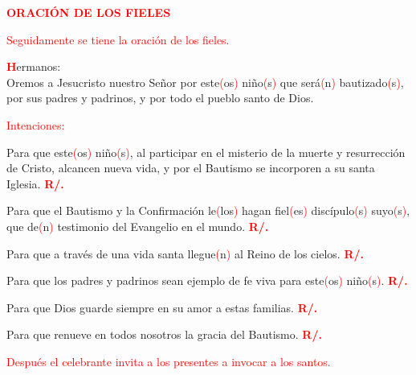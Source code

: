 \documentclass[12pt, letterpaper, spanish]{article}
\begin{document}
  \Large {\bfseries \textcolor{red}{ORACI\'ON DE LOS FIELES}} 

  \large {\textcolor{red}{Seguidamente se tiene la oraci\'on de los fieles.}} 

  \lettrine[lines=2]{\bfseries \textcolor{red}{H}}{}\Large ermanos:\\
  Oremos a Jesucristo nuestro Se\~nor por este\textcolor{red}{(}os\textcolor{red}{)} ni\~no\textcolor{red}{(}s\textcolor{red}{)} que ser\'a\textcolor{red}{(}n\textcolor{red}{)} bautizado\textcolor{red}{(}s\textcolor{red}{)}, por sus padres y padrinos, y por todo el pueblo santo de Dios.

  \noindent
  \large {\textcolor{red}{Intenciones:}} 

  \noindent
  \Large {Para que este\textcolor{red}{(}os\textcolor{red}{)} ni\~no\textcolor{red}{(}s\textcolor{red}{)}, al participar en el misterio de la muerte y resurrecci\'on de Cristo, alcancen nueva vida, y por el Bautismo se incorporen a su santa Iglesia.
  \hspace{1cm} \bfseries \textcolor{red}{R/.}}

  \noindent
  \Large {Para que el Bautismo y la Confirmaci\'on le\textcolor{red}{(}los\textcolor{red}{)} hagan fiel\textcolor{red}{(}es\textcolor{red}{)} disc\'ipulo\textcolor{red}{(}s\textcolor{red}{)} suyo\textcolor{red}{(}s\textcolor{red}{)}, que de\textcolor{red}{(}n\textcolor{red}{)} testimonio del Evangelio en el mundo. 
  \hspace{1cm} \bfseries \textcolor{red}{R/.}}

  \noindent
  \Large {Para que a trav\'es de una vida santa llegue\textcolor{red}{(}n\textcolor{red}{)} al Reino de los cielos.
  \hspace{1cm} \bfseries \textcolor{red}{R/.}}

  \noindent
  \Large {Para que los padres y padrinos sean ejemplo de fe viva para este\textcolor{red}{(}os\textcolor{red}{)} ni\~no\textcolor{red}{(}s\textcolor{red}{)}.
  \hspace{1cm} \bfseries \textcolor{red}{R/.}}

  \noindent
  \Large {Para que Dios guarde siempre en su amor a estas familias.
  \hspace{1cm} \bfseries \textcolor{red}{R/.}}

  \noindent
  \Large {Para que renueve en todos nosotros la gracia del Bautismo.
  \hspace{1cm} \bfseries \textcolor{red}{R/.}}

  \large {\textcolor{red}{Despu\'es el celebrante invita a los presentes a invocar a los santos.}} 
\end{document}
